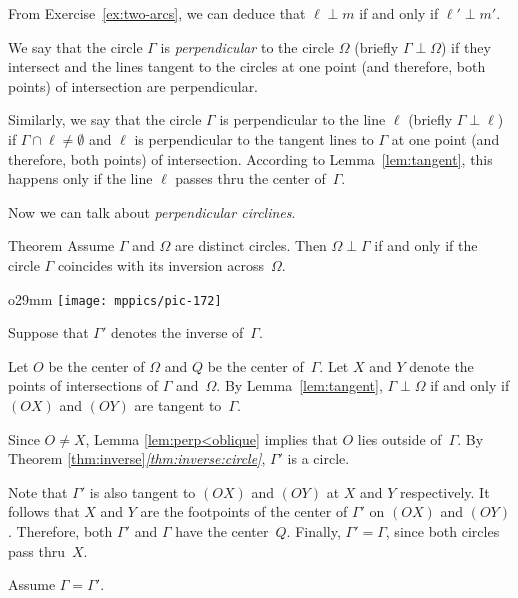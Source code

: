 From Exercise~\ref{ex:two-arcs}, we can deduce that  
 $\ell\perp m$ if and only if $\ell'\perp m'$.

We say that the circle $\Gamma$ is {}\emph{perpendicular} to the circle $\Omega$ 
(briefly $\Gamma\perp \Omega$)
if they intersect and the lines tangent to the circles at one point 
(and therefore, both points) 
of intersection are perpendicular.

Similarly, we say that the circle $\Gamma$ is perpendicular to the line $\ell$ (briefly $\Gamma\perp \ell$)
if $\Gamma\cap\ell\ne \emptyset$ and $\ell$ is perpendicular to the tangent lines to $\Gamma$ at one point (and therefore, both points) of intersection.
According to Lemma~\ref{lem:tangent}, 
this happens only if the line $\ell$ passes thru the center of~$\Gamma$.

Now we can talk about \emph{perpendicular circlines}.

\begin{thm}{Theorem}\label{thm:perp-inverse}
Assume $\Gamma$ and $\Omega$ are distinct circles. 
Then $\Omega\perp\Gamma$ if and only if the circle $\Gamma$ coincides with its inversion across~$\Omega$.
\end{thm}

\begin{wrapfigure}[7]{o}{29mm}
\vskip-4mm
\centering
\texttt{[image: mppics/pic-172]}
\end{wrapfigure}

Suppose that $\Gamma'$ denotes the inverse of~$\Gamma$.

Let $O$ be the center of $\Omega$
and $Q$ be the center of~$\Gamma$.
Let $X$ and $Y$ denote the points of intersections of  $\Gamma$ and~$\Omega$.
By Lemma~\ref{lem:tangent}, $\Gamma\perp\Omega$ if and only if $(OX)$ and $(OY)$ are tangent to~$\Gamma$.

Since $O\ne X$, Lemma \ref{lem:perp<oblique} implies that $O$ lies outside of~$\Gamma$.
By Theorem \ref{thm:inverse}\textit{\ref{thm:inverse:circle}}, $\Gamma'$ is a circle.

Note that $\Gamma'$ is also tangent to $(OX)$ and $(OY)$ at $X$ and $Y$ respectively. 
It follows that $X$ and $Y$ are the footpoints of the center of $\Gamma'$ on $(OX)$ and $(OY)$.
Therefore, both $\Gamma'$ and $\Gamma$ have the center~$Q$.
Finally, $\Gamma'=\Gamma$, since both circles pass thru~$X$.

Assume $\Gamma=\Gamma'$.

